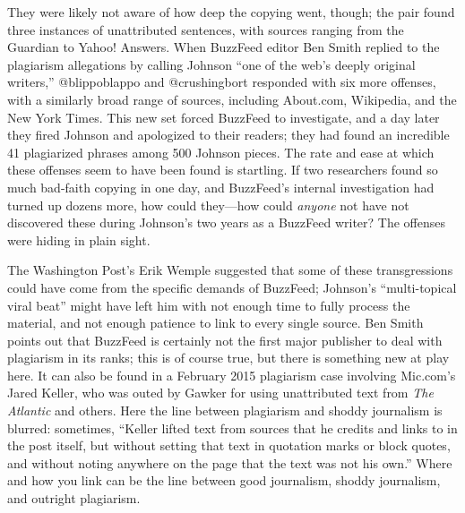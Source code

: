 They were likely not aware of how deep the copying went, though; the pair found three instances of unattributed sentences, with sources ranging from the Guardian to Yahoo! Answers.\autocite{blippoblappo_3_2014} When BuzzFeed editor Ben Smith replied to the plagiarism allegations by calling Johnson ``one of the web's deeply original writers,'' @blippoblappo and @crushingbort responded with six more offenses, with a similarly broad range of sources, including About.com, Wikipedia, and the New York Times.\autocite{blippoblappo_more_2014} This new set forced BuzzFeed to investigate, and a day later they fired Johnson and apologized to their readers; they had found an incredible 41 plagiarized phrases among 500 Johnson pieces.\autocite{smith_editors_2014} The rate and ease at which these offenses seem to have been found is startling. If two researchers found so much bad-faith copying in one day, and BuzzFeed's internal investigation had turned up dozens more, how could they---how could \emph{anyone} not have not discovered these during Johnson's two years as a BuzzFeed writer? The offenses were hiding in plain sight.

The Washington Post's Erik Wemple suggested that some of these transgressions could have come from the specific demands of BuzzFeed; Johnson's ``multi-topical viral beat'' might have left him with not enough time to fully process the material, and not enough patience to link to every single source.\autocite{wemple_ravages_2014} Ben Smith points out that BuzzFeed is certainly not the first major publisher to deal with plagiarism in its ranks; this is of course true, but there is something new at play here. It can also be found in a February 2015 plagiarism case involving Mic.com's Jared Keller, who was outed by Gawker for using unattributed text from \emph{The Atlantic} and others. Here the line between plagiarism and shoddy journalism is blurred: sometimes, ``Keller lifted text from sources that he credits and links to in the post itself, but without setting that text in quotation marks or block quotes, and without noting anywhere on the page that the text was not his own.''\autocite{trotter_plagiarist_2015} Where and how you link can be the line between good journalism, shoddy journalism, and outright plagiarism.

